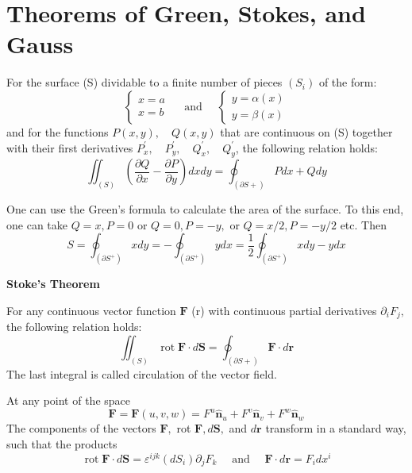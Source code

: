 \section{Theorems of Green, Stokes, and Gauss}
\begin{thm}
For the surface (S) dividable to a finite number of pieces $(S_i)$ of the form:
$$
\left\{\begin{array}{l}
{x=a} \\
{x=b}
\end{array} \quad \text { and } \quad\left\{\begin{array}{l}
{y=\alpha(x)} \\
{y=\beta(x)}
\end{array}\right.\right.
$$
and for the functions $P(x, y), \quad Q(x, y)$ that are continuous on (S) together with their first derivatives $P_{x}^{\prime}, \quad P_{y}^{\prime}, \quad Q_{x}^{\prime}, \quad Q_{y}^{\prime}$, the following relation holds:
\begin{equation}
\iint_{(S)}\left(\frac{\partial Q}{\partial x}-\frac{\partial P}{\partial y}\right) d x d y=\oint_{(\partial S+)} P d x+Q d y
\end{equation}
\end{thm}
One can use the Green's formula to calculate the area of the surface. To this end, one can take $Q=x, P=0$ or $Q=0, P=-y,$ or $Q=x / 2, P=-y / 2$ etc. Then
\begin{equation}
S=\oint_{\left(\partial S^{+}\right)} x d y=-\oint_{\left(\partial S^{+}\right)} y d x=\frac{1}{2} \oint_{\left(\partial S^{+}\right)} x d y-y d x
\end{equation}
\begin{thm}
\textbf{Stoke's Theorem}

For any continuous vector function $\mathbf{F}$ (r) with continuous partial derivatives $\partial_{i} F_{j},$ the following relation holds:
\begin{equation}
\iint_{(S)} \operatorname{rot} \mathbf{F} \cdot d \mathbf{S}=\oint_{(\partial S+)} \mathbf{F} \cdot d \mathbf{r}
\end{equation}
The last integral is called circulation of the vector field.
\end{thm}
At any point of the space
$$
\mathbf{F}=\mathbf{F}(u, v, w)=F^{u} \hat{\mathbf{n}}_{u}+F^{v} \hat{\mathbf{n}}_{v}+F^{w} \hat{\mathbf{n}}_{w}
$$
The components of the vectors $\mathbf{F},$ rot $\mathbf{F}, d \mathbf{S},$ and $d \mathbf{r}$ transform in a standard way, such that the products
$$
\operatorname{rot} \mathbf{F} \cdot d \mathbf{S}=\varepsilon^{i j k}\left(d S_{i}\right) \partial_{j} F_{k} \quad \text { and } \quad \mathbf{F} \cdot d \mathbf{r}=F_{i} d x^{i}
$$
